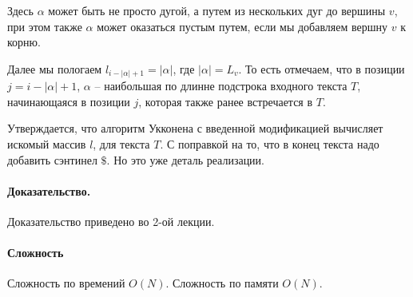 \documentclass[12pt]{article}
\begin{document}
Здесь $ \alpha $ может быть не просто дугой, а путем из нескольких дуг до
вершины $ v $, при этом также $ \alpha $ может оказаться пустым путем, если
мы добавляем вершну $ v $ к корню.

Далее мы пологаем $ l_{i - |\alpha| + 1} = |\alpha| $, где $ |\alpha| = L_v $.
То есть отмечаем, что в позиции $ j = i - |\alpha| + 1 $,  $ \alpha $ --
наибольшая по длинне подстрока входного текста $ T $, начинающаяся в
позиции $ j $, которая также ранее встречается в $ T $.

Утверждается, что алгоритм Укконена с введенной модификацией вычисляет
искомый массив $ l $, для текста $ T $. С поправкой на то, что в конец
текста надо добавить сэнтинел $\$$. Но это уже деталь реализации.


\paragraph{Доказательство.}
Доказательство приведено во 2-ой лекции.






\paragraph{Сложность}
Сложность по времений $ O(N) $.
Сложность по памяти $ O(N) $.
\end{document}
